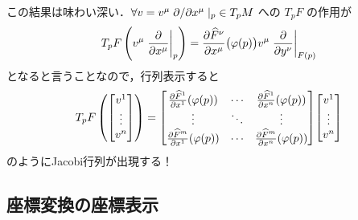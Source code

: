 \documentclass[geometry_main]{subfiles}
\begin{document}
この結果は味わい深い．$\forall v = v^\mu \pdv*{}{x^\mu}|_p \in T_p M$ への $T_p F$ の作用が
\begin{align}
	T_p F \left( v^\mu\eval{\pdv{}{x^\mu}}_p  \right) = \pdv{\widehat{F}^\nu}{x^\mu}()\bigl( \varphi(p) \bigr) v^\mu \eval{\pdv{}{y^\nu}}_{F(p)}
\end{align}
となると言うことなので，行列表示すると
\begin{align}
	T_p F \left( \mqty[v^1 \\ \vdots \\ v^n]\right) = \mqty[\pdv{\widehat{F}^1}{x^1}()(\varphi(p)) & \cdots & \pdv{\widehat{F}^1}{x^n}()(\varphi(p)) \\ \vdots & \ddots & \vdots \\ \pdv{\widehat{F}^m}{x^1}()(\varphi(p)) & \cdots & \pdv{\widehat{F}^m}{x^n}()(\varphi(p))] \mqty[v^1 \\ \vdots \\ v^n]
\end{align}
のようにJacobi行列が出現する！

\subsection{座標変換の座標表示}
\end{document}
